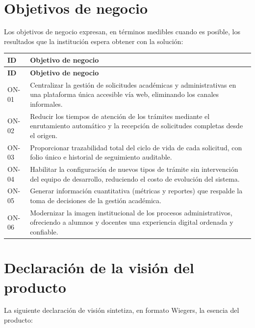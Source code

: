 \documentclass[12pt,letterpaper]{report}
\begin{document}
\section{Objetivos de negocio}

Los objetivos de negocio expresan, en términos medibles cuando es posible, los resultados que la institución espera obtener con la solución:

\begin{longtable}{|C{1.6cm}|L{12cm}|}
    \hline
    \textbf{ID} & \textbf{Objetivo de negocio} \\
    \hline
    \endfirsthead
    \hline
    \textbf{ID} & \textbf{Objetivo de negocio} \\
    \hline
    \endhead
    \hline
    \endfoot

    ON-01 & Centralizar la gestión de solicitudes académicas y administrativas en una plataforma única accesible vía web, eliminando los canales informales. \\
    \hline
    ON-02 & Reducir los tiempos de atención de los trámites mediante el enrutamiento automático y la recepción de solicitudes completas desde el origen. \\
    \hline
    ON-03 & Proporcionar trazabilidad total del ciclo de vida de cada solicitud, con folio único e historial de seguimiento auditable. \\
    \hline
    ON-04 & Habilitar la configuración de nuevos tipos de trámite sin intervención del equipo de desarrollo, reduciendo el costo de evolución del sistema. \\
    \hline
    ON-05 & Generar información cuantitativa (métricas y reportes) que respalde la toma de decisiones de la gestión académica. \\
    \hline
    ON-06 & Modernizar la imagen institucional de los procesos administrativos, ofreciendo a alumnos y docentes una experiencia digital ordenada y confiable. \\
    \hline
\end{longtable}

\section{Declaración de la visión del producto}

La siguiente declaración de visión sintetiza, en formato Wiegers, la esencia del producto:
\end{document}
